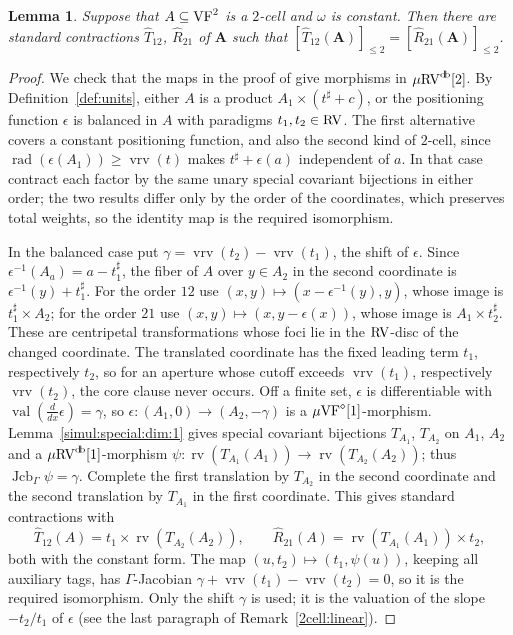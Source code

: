 \documentclass[12pt]{amsart}
\theoremstyle{plain}
\newtheorem{lem}[thm]{Lemma}
\theoremstyle{definition}
\theoremstyle{remark}
\numberwithin{equation}{section}
\theoremstyle{plain}
\newcommand{\VF}{\textup{VF}}
\newcommand{\RV}{\textup{RV}}
\DeclareMathOperator{\jcb}{Jcb}
\newcommand{\0}{\emptyset}
\newcommand{\fun}{\longrightarrow}
\newcommand{\efun}{\longmapsto}
\newcommand{\sub}{\subseteq}
\newcommand{\mVF}{{\mu}{\VF}}
\newcommand{\mRV}{{\mu}{\RV}}
\DeclareMathOperator{\rv}{rv}
\DeclareMathOperator{\vv}{val}
\DeclareMathOperator{\rad}{rad}
\DeclareMathOperator{\vrv}{vrv}
\DeclareMathOperator{\db}{d \! b}
\newcommand{\ddx}{\tfrac{d}{d x}}
\begin{document}
\begin{lem}\label{2:unit:contracted}
Suppose that $A \sub \VF^2$ is a $2$-cell and $\omega$ is constant. Then there are standard contractions $\hat T_{12}$, $\hat R_{21}$ of $\bm A$ such that $[\hat T_{12}(\bm A)]_{\leq 2} = [\hat R_{21}(\bm A)]_{\leq 2}$.
\end{lem}
\begin{proof}
We check that the maps in the proof of \cite[Lemma~5.7]{Yin:int:acvf} give morphisms in $\mRV^{\db}[2]$. By Definition~\ref{def:units}, either $A$ is a product $A_1 \times (t^\sharp + c)$, or the positioning function $\epsilon$ is balanced in $A$ with paradigms $t_1, t_2 \in \RV$. The first alternative covers a constant positioning function, and also the second kind of $2$-cell, since $\rad(\epsilon(A_1)) \geq \vrv(t)$ makes $t^\sharp + \epsilon(a)$ independent of $a$. In that case contract each factor by the same unary special covariant bijections in either order; the two results differ only by the order of the coordinates, which preserves total weights, so the identity map is the required isomorphism.

In the balanced case put $\gamma = \vrv(t_2) - \vrv(t_1)$, the shift of $\epsilon$. Since $\epsilon^{-1}(A_a) = a - t_1^\sharp$, the fiber of $A$ over $y \in A_2$ in the second coordinate is $\epsilon^{-1}(y) + t_1^\sharp$. For the order $12$ use $(x, y) \efun (x - \epsilon^{-1}(y), y)$, whose image is $t_1^\sharp \times A_2$; for the order $21$ use $(x, y) \efun (x, y - \epsilon(x))$, whose image is $A_1 \times t_2^\sharp$. These are centripetal transformations whose foci lie in the $\RV$-disc of the changed coordinate. The translated coordinate has the fixed leading term $t_1$, respectively $t_2$, so for an aperture whose cutoff exceeds $\vrv(t_1)$, respectively $\vrv(t_2)$, the core clause never occurs. Off a finite set, $\epsilon$ is differentiable with $\vv(\ddx \epsilon) = \gamma$, so $\epsilon : (A_1, 0) \fun (A_2, -\gamma)$ is a $\mVF^\diamond[1]$-morphism. Lemma~\ref{simul:special:dim:1} gives special covariant bijections $T_{A_1}$, $T_{A_2}$ on $A_1$, $A_2$ and a $\mRV^{\db}[1]$-morphism $\psi : \rv(T_{A_1}(A_1)) \fun \rv(T_{A_2}(A_2))$; thus $\jcb_\Gamma \psi = \gamma$. Complete the first translation by $T_{A_2}$ in the second coordinate and the second translation by $T_{A_1}$ in the first coordinate. This gives standard contractions with
\[
\hat T_{12}(A) = t_1 \times \rv(T_{A_2}(A_2)), \qquad \hat R_{21}(A) = \rv(T_{A_1}(A_1)) \times t_2,
\]
both with the constant form. The map $(u, t_2) \efun (t_1, \psi(u))$, keeping all auxiliary tags, has $\Gamma$-Jacobian $\gamma + \vrv(t_1) - \vrv(t_2) = 0$, so it is the required isomorphism. Only the shift $\gamma$ is used; it is the valuation of the slope $-t_2/t_1$ of $\epsilon$ (see the last paragraph of Remark~\ref{2cell:linear}).
\end{proof}
\end{document}
